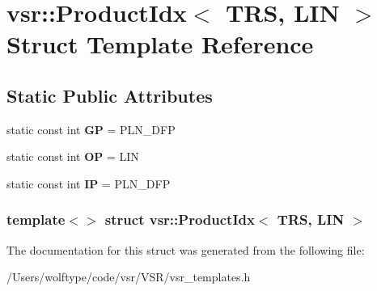 \hypertarget{structvsr_1_1_product_idx_3_01_t_r_s_00_01_l_i_n_01_4}{\section{vsr\-:\-:Product\-Idx$<$ T\-R\-S, L\-I\-N $>$ Struct Template Reference}
\label{structvsr_1_1_product_idx_3_01_t_r_s_00_01_l_i_n_01_4}
}
\subsection*{Static Public Attributes}
\begin{DoxyCompactItemize}
\item 
\hypertarget{structvsr_1_1_product_idx_3_01_t_r_s_00_01_l_i_n_01_4_a44429089fd33237b0e4089688edecb75}{static const int {\bfseries G\-P} = P\-L\-N\-\_\-\-D\-F\-P}\label{structvsr_1_1_product_idx_3_01_t_r_s_00_01_l_i_n_01_4_a44429089fd33237b0e4089688edecb75}

\item 
\hypertarget{structvsr_1_1_product_idx_3_01_t_r_s_00_01_l_i_n_01_4_ab76534601029d275dcd9f70394986c7b}{static const int {\bfseries O\-P} = L\-I\-N}\label{structvsr_1_1_product_idx_3_01_t_r_s_00_01_l_i_n_01_4_ab76534601029d275dcd9f70394986c7b}

\item 
\hypertarget{structvsr_1_1_product_idx_3_01_t_r_s_00_01_l_i_n_01_4_a00a89e9ac475c5822e80ebcf6e165cdf}{static const int {\bfseries I\-P} = P\-L\-N\-\_\-\-D\-F\-P}\label{structvsr_1_1_product_idx_3_01_t_r_s_00_01_l_i_n_01_4_a00a89e9ac475c5822e80ebcf6e165cdf}

\end{DoxyCompactItemize}
\subsubsection*{template$<$$>$ struct vsr\-::\-Product\-Idx$<$ T\-R\-S, L\-I\-N $>$}



The documentation for this struct was generated from the following file\-:\begin{DoxyCompactItemize}
\item 
/\-Users/wolftype/code/vsr/\-V\-S\-R/vsr\-\_\-templates.\-h\end{DoxyCompactItemize}
